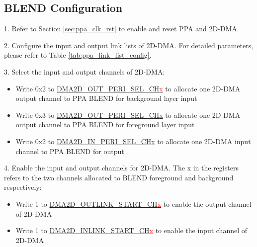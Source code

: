 \documentclass[main\_\_EN.tex]{subfiles}
\begin{document}
\subsection{BLEND Configuration}
1. Refer to Section \ref{sec:ppa_clk_rst} to enable and reset PPA and 2D-DMA.

2. Configure the input and output link lists of 2D-DMA. For detailed parameters, please refer to Table \ref{tab:ppa_link_list_config}.

3. Select the input and output channels of 2D-DMA:
\begin{itemize}
    \item Write 0x2 to \hyperref[fielddesc:DMA2DOUTPERISELCHN]{DMA2D\_OUT\_PERI\_SEL\_CH\textcolor{red}{x}} to allocate one 2D-DMA output channel to PPA BLEND for background layer input
    \item Write 0x3 to \hyperref[fielddesc:DMA2DOUTPERISELCHN]{DMA2D\_OUT\_PERI\_SEL\_CH\textcolor{red}{x}} to allocate one 2D-DMA output channel to PPA BLEND for foreground layer input
    \item Write 0x2 to \hyperref[fielddesc:DMA2DINPERISELCHN]{DMA2D\_IN\_PERI\_SEL\_CH\textcolor{red}{x}} to allocate one 2D-DMA input channel to PPA BLEND for output
\end{itemize}

4. Enable the input and output channels for 2D-DMA. The x in the registers refers to the two channels allocated to BLEND foreground and background respectively:
\begin{itemize}
    \item Write 1 to \hyperref[fielddesc:DMA2DOUTLINKSTARTCHN]{DMA2D\_OUTLINK\_START\_CH\textcolor{red}{x}} to enable the output channel of 2D-DMA
    \item Write 1 to \hyperref[fielddesc:DMA2DINLINKSTARTCHN]{DMA2D\_INLINK\_START\_CH\textcolor{red}{x}} to enable the input channel of 2D-DMA
\end{itemize}
\end{document}
